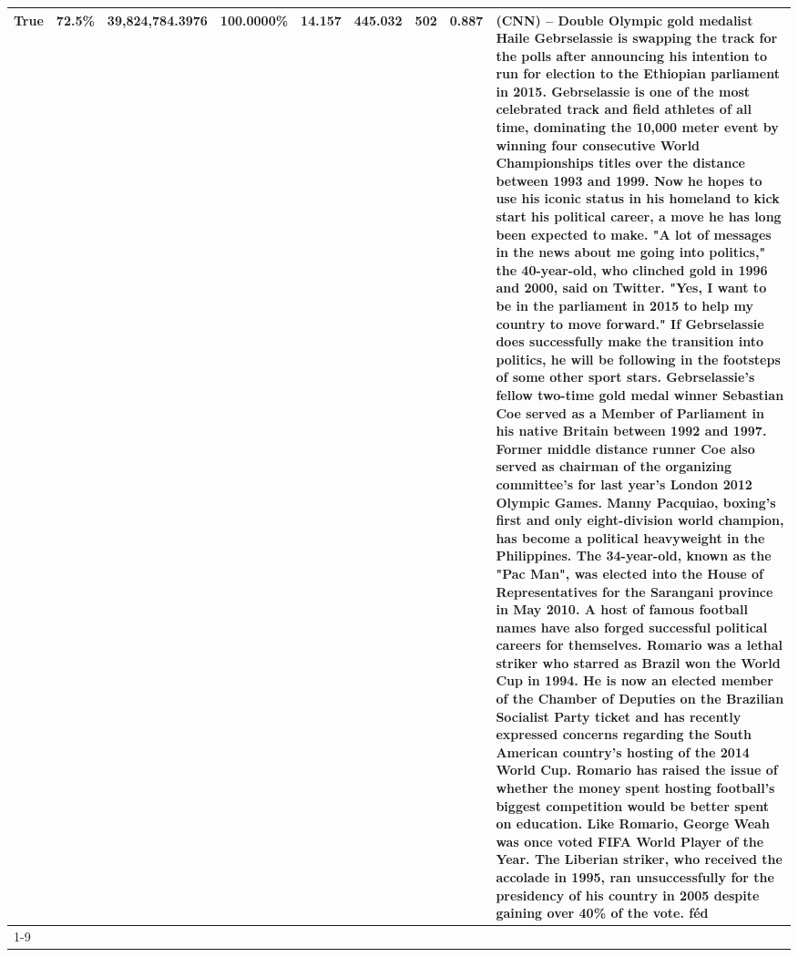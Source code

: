 \begin{table}[H]
{\begin{tabular}{lllrlllll}
True & 72.5\% & 39,824,784.3976 & \bfseries \color{red} 100.0000\% & 14.157 & 445.032 & 502 & 0.887 & (CNN) -- Double Olympic gold medalist Haile Gebrselassie is swapping the track for the polls after announcing his intention to run for election to the Ethiopian parliament in 2015. Gebrselassie is one of the most celebrated track and field athletes of all time, dominating the 10,000 meter event by winning four consecutive World Championships titles over the distance between 1993 and 1999. Now he hopes to use his iconic status in his homeland to kick start his political career, a move he has long been expected to make. "A lot of messages in the news about me going into politics," the 40-year-old, who clinched gold in 1996 and 2000, said on Twitter. "Yes, I want to be in the parliament in 2015 to help my country to move forward." If Gebrselassie does successfully make the transition into politics, he will be following in the footsteps of some other sport stars. Gebrselassie's fellow two-time gold medal winner Sebastian Coe served as a Member of Parliament in his native Britain between 1992 and 1997. Former middle distance runner Coe also served as chairman of the organizing committee's for last year's London 2012 Olympic Games. Manny Pacquiao, boxing's first and only eight-division world champion, has become a political heavyweight in the Philippines. The 34-year-old, known as the "Pac Man", was elected into the House of Representatives for the Sarangani province in May 2010. A host of famous football names have also forged successful political careers for themselves. Romario was a lethal striker who starred as Brazil won the World Cup in 1994. He is now an elected member of the Chamber of Deputies on the Brazilian Socialist Party ticket and has recently expressed concerns regarding the South American country's hosting of the 2014 World Cup. Romario has raised the issue of whether the money spent hosting football's biggest competition would be better spent on education. Like Romario, George Weah was once voted FIFA World Player of the Year. The Liberian striker, who received the accolade in 1995, ran unsuccessfully for the presidency of his country in 2005 despite gaining over 40\% of the vote. féd \\
\cline{1-9}

\end{tabular}}
\end{table}
